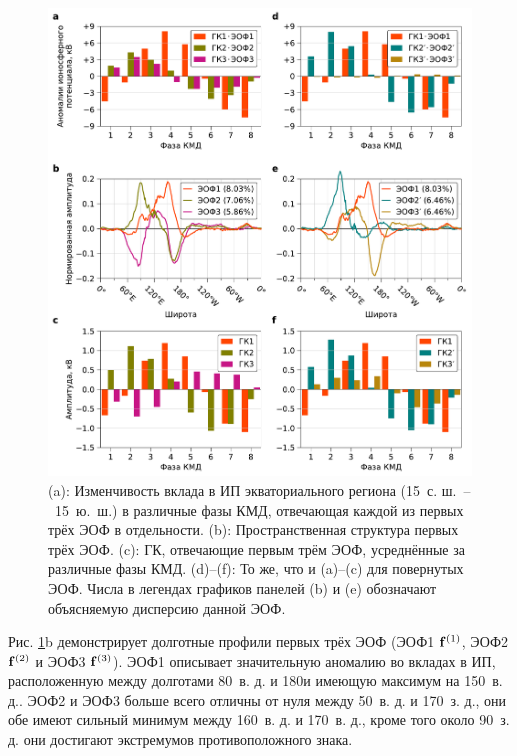 \begin{figure}[htbp]
    \centering
    \includegraphics[width=\textwidth]{figures/eofs_and_pcs.pdf}
    \caption{(a): Изменчивость вклада в ИП экваториального региона (15\textdegree\ с. ш.~--~15\textdegree~ю.~ш.) в различные фазы КМД, отвечающая каждой из первых трёх ЭОФ в отдельности. (b): Пространственная структура первых трёх ЭОФ. (c): ГК, отвечающие первым трём ЭОФ, усреднённые за различные фазы КМД. (d)--(f): То же, что и (a)--(c) для повернутых ЭОФ. Числа в легендах графиков панелей (b) и (e) обозначают объясняемую дисперсию данной ЭОФ.}
    \label{fig:eofs_and_pcs}
\end{figure}

Рис. \ref{fig:eofs_and_pcs}{b} демонстрирует долготные профили первых трёх ЭОФ (ЭОФ1 $\vb{f}^{(1)}$, ЭОФ2 $\vb{f}^{(2)}$ и ЭОФ3 $\vb{f}^{(3)}$). ЭОФ1 описывает значительную аномалию во вкладах в ИП, расположенную между долготами 80\textdegree\ в. д. и 180\textdegree и имеющую максимум на 150\textdegree\ в. д.. ЭОФ2 и ЭОФ3 больше всего отличны от нуля между 50\textdegree\ в. д. и 170\textdegree\ з. д., они обе имеют сильный минимум между 160\textdegree\ в. д. и 170\textdegree\ в. д., кроме того около 90\textdegree\ з. д. они достигают экстремумов противоположного знака.

